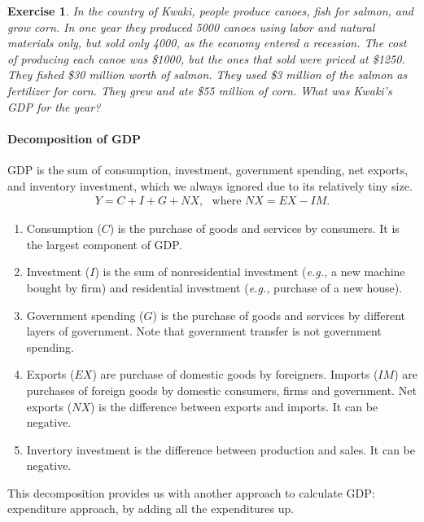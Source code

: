 \documentclass[12pt]{article}
\newtheorem{exercise}{Exercise}
\numberwithin{equation}{section}
\begin{document}
\begin{exercise}
    In the country of Kwaki, people produce canoes, fish for salmon, and grow corn. In one year they produced 5000 canoes using labor and natural materials only, but sold only 4000, as the economy entered a recession. The cost of producing each canoe was \$1000, but the ones that sold were priced at \$1250. They fished \$30 million worth of salmon. They used \$3 million of the salmon as fertilizer for corn. They grew and ate \$55 million of corn. What was Kwaki's GDP for the year?
\end{exercise}


\paragraph{Decomposition of GDP}
GDP is the sum of consumption, investment, government spending, net exports, and inventory investment, which we always ignored due to its relatively tiny size.
\begin{align*}
    Y = C + I + G + NX,\,\,\,\, \text{where } NX = EX - IM.
\end{align*}
\begin{enumerate}[label=(\arabic*)]
    \item Consumption ($C$) is the purchase of goods and services by consumers. It is the largest component of GDP.
    \item Investment ($I$) is the sum of nonresidential investment (\textit{e.g.,} a new machine bought by firm) and residential investment (\textit{e.g., }purchase of a new house). 
    \item Government spending ($G$) is the purchase of goods and services by different layers of government. Note that government transfer is not government spending.
    \item Exports ($EX$) are purchase of domestic goods by foreigners. Imports ($IM$) are purchases of foreign goods by domestic consumers, firms and government. Net exports ($NX$) is the difference between exports and imports. It can be negative. 
    \item Invertory investment is the difference between production and sales. It can be negative.
\end{enumerate}

This decomposition provides us with another approach to calculate GDP: expenditure approach, by adding all the expenditures up.
\end{document}
